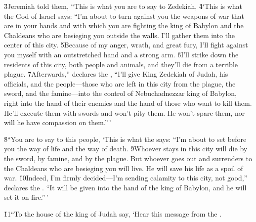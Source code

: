 \v{3}Jeremiah told them, ``This is what you are to say to Zedekiah, \v{4}`This is what the  God of Israel says: ``I'm about to turn against you the weapons of war that are in your hands and with which you are fighting the king of Babylon and the Chaldeans who are besieging you outside the walls. I'll gather them into the center of this city. \v{5}Because of my anger, wrath, and great fury, I'll fight against you myself with an outstretched hand and a strong arm. \v{6}I'll strike down the residents of this city, both people and animals, and they'll die from a terrible plague. \v{7}Afterwards,'' declares the , ``I'll give King Zedekiah of Judah, his officials, and the people---those who are left in this city from the plague, the sword, and the famine---into the control of Nebuchadnezzar king of Babylon, right into the hand of their enemies and the hand of those who want to kill them. He'll execute them with swords and won't pity them. He won't spare them, nor will he have compassion on them.''\,'

\v{8}``You are to say to this people, `This is what the  says: ``I'm about to set before you the way of life and the way of death. \v{9}Whoever stays in this city will die by the sword, by famine, and by the plague. But whoever goes out and surrenders to the Chaldeans who are besieging you will live. He will save his life as a spoil of war. \v{10}Indeed, I'm firmly decided---I'm sending calamity to this city, not good,'' declares the . ``It will be given into the hand of the king of Babylon, and he will set it on fire.''\,'

\v{11}``To the house of the king of Judah say, `Hear this message from the .

